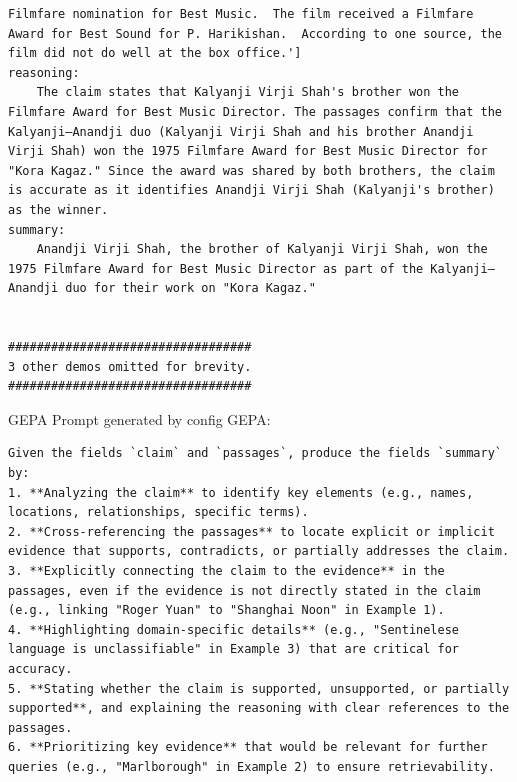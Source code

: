 \begin{instructbox}
\begin{lstlisting}[breakindent=0pt, breaklines=true, breakatwhitespace=true, frame=single, backgroundcolor=\color{green!10}]
Filmfare nomination for Best Music.  The film received a Filmfare Award for Best Sound for P. Harikishan.  According to one source, the film did not do well at the box office.']
reasoning:
    The claim states that Kalyanji Virji Shah's brother won the Filmfare Award for Best Music Director. The passages confirm that the Kalyanji–Anandji duo (Kalyanji Virji Shah and his brother Anandji Virji Shah) won the 1975 Filmfare Award for Best Music Director for "Kora Kagaz." Since the award was shared by both brothers, the claim is accurate as it identifies Anandji Virji Shah (Kalyanji's brother) as the winner.
summary:
    Anandji Virji Shah, the brother of Kalyanji Virji Shah, won the 1975 Filmfare Award for Best Music Director as part of the Kalyanji–Anandji duo for their work on "Kora Kagaz."


##################################
3 other demos omitted for brevity.
##################################

\end{lstlisting}

GEPA Prompt generated by config GEPA:
\begin{lstlisting}[breakindent=0pt, breaklines=true, breakatwhitespace=true, frame=single, backgroundcolor=\color{blue!10}]
Given the fields `claim` and `passages`, produce the fields `summary` by:  
1. **Analyzing the claim** to identify key elements (e.g., names, locations, relationships, specific terms).  
2. **Cross-referencing the passages** to locate explicit or implicit evidence that supports, contradicts, or partially addresses the claim.  
3. **Explicitly connecting the claim to the evidence** in the passages, even if the evidence is not directly stated in the claim (e.g., linking "Roger Yuan" to "Shanghai Noon" in Example 1).  
4. **Highlighting domain-specific details** (e.g., "Sentinelese language is unclassifiable" in Example 3) that are critical for accuracy.  
5. **Stating whether the claim is supported, unsupported, or partially supported**, and explaining the reasoning with clear references to the passages.  
6. **Prioritizing key evidence** that would be relevant for further queries (e.g., "Marlborough" in Example 2) to ensure retrievability.  


\end{lstlisting}
\end{instructbox}
